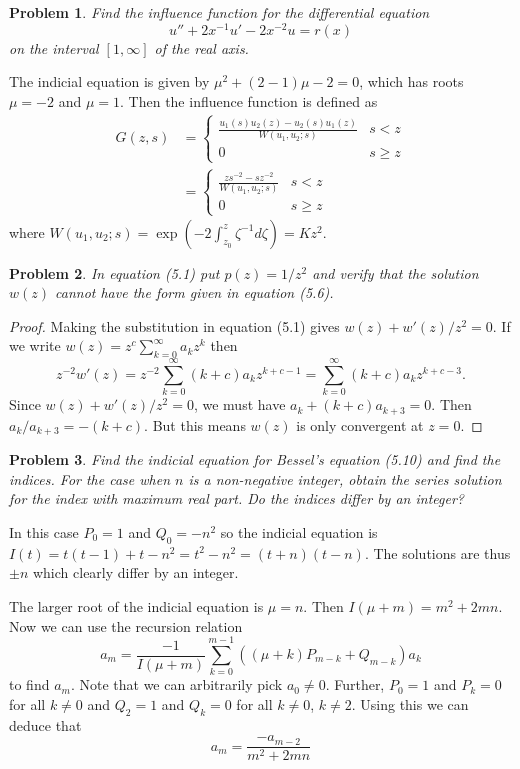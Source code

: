 \documentclass{article}
\newtheorem{problem}{Problem}
\begin{document}
\begin{problem}
Find the influence function for the differential equation
\[
u'' + 2x^{-1}u' - 2x^{-2}u = r(x)
\]
on the interval $[1, \infty]$ of the real axis.
\end{problem}

The indicial equation is given by $\mu^2 + (2 - 1) \mu - 2 = 0$, which has roots $\mu = -2$ and $\mu = 1$. Then the influence function is defined as
\begin{align*}
G(z,s)
&=
\begin{cases}
\frac{u_1(s) u_2(z) - u_2(s) u_1(z)}{W(u_1,u_2;s)} & s < z\\
0 & s \geq z
\end{cases}\\
&=
\begin{cases}
\frac{zs^{-2} - sz^{-2}}{W(u_1,u_2;s)} & s < z\\
0 & s \geq z
\end{cases}
\end{align*}
where $W(u_1,u_2;s) = \exp \left ( - 2\int_{z_0}^z \zeta^{-1} d \zeta \right ) = K z^2$.

\begin{problem}
In equation (5.1) put $p(z) = 1/z^2$ and verify that the solution $w(z)$ cannot have the form given in equation (5.6).
\end{problem}
\begin{proof}
Making the substitution in equation (5.1) gives $w(z) + w'(z)/z^2 = 0$. If we write $w(z) = z^c \sum_{k=0}^{\infty} a_k z^k$ then
\[
z^{-2} w'(z) = z^{-2} \sum_{k=0}^{\infty} (k+c) a_k z^{k+c-1} = \sum_{k=0}^{\infty} (k+c) a_k z^{k+c-3}.
\]
Since $w(z) + w'(z)/z^2 = 0$, we must have $a_k + (k+c) a_{k+3} = 0$. Then $a_k/a_{k+3} = -(k+c)$. But this means $w(z)$ is only convergent at $z = 0$.
\end{proof}

\begin{problem}
Find the indicial equation for Bessel's equation (5.10) and find the indices. For the case when $n$ is a non-negative integer, obtain the series solution for the index with maximum real part. Do the indices differ by an integer?
\end{problem}

In this case $P_0 = 1$ and $Q_0 = -n^2$ so the indicial equation is $I(t) = t(t-1) + t - n^2 = t^2 - n^2 = (t+n)(t-n)$. The solutions are thus $\pm n$ which clearly differ by an integer.

The larger root of the indicial equation is $\mu = n$. Then $I(\mu + m) = m^2 + 2mn$. Now we can use the recursion relation
\[
a_m = \frac{-1}{I(\mu + m)} \sum_{k=0}^{m-1}((\mu + k) P_{m-k} + Q_{m-k}) a_k
\]
to find $a_m$. Note that we can arbitrarily pick $a_0 \neq 0$. Further, $P_0 = 1$ and $P_k = 0$ for all $k \neq 0$ and $Q_2 = 1$ and $Q_k = 0$ for all $k \neq 0$, $k \neq 2$. Using this we can deduce that
\[
a_m = \frac{-a_{m-2}}{m^2 + 2mn}
\]
\end{document}
